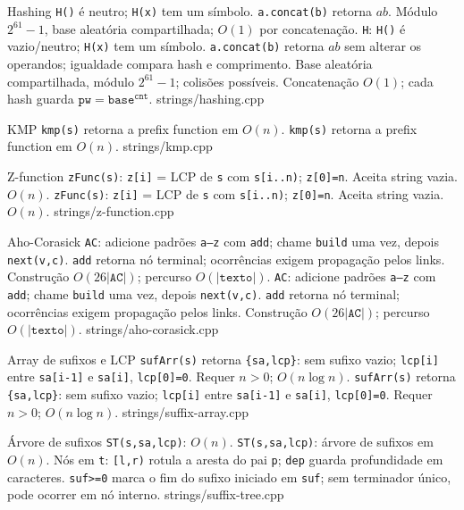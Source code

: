 \templateentry
{Hashing}
{\texttt{H()} é neutro; \texttt{H(x)} tem um símbolo. \texttt{a.concat(b)} retorna $ab$. Módulo $2^{61}-1$, base aleatória compartilhada; $O(1)$ por concatenação.}
{\texttt{H}: \texttt{H()} é vazio/neutro; \texttt{H(x)} tem um símbolo. \texttt{a.concat(b)} retorna $ab$ sem alterar os operandos; igualdade compara hash e comprimento. Base aleatória compartilhada, módulo $2^{61}-1$; colisões possíveis. Concatenação $O(1)$; cada hash guarda $\mathtt{pw}=\mathtt{base}^{\mathtt{cnt}}$.}
{strings/hashing.cpp}

\templateentry
{KMP}
{\texttt{kmp(s)} retorna a prefix function em $O(n)$.}
{\texttt{kmp(s)} retorna a prefix function em $O(n)$.}
{strings/kmp.cpp}

\templateentry
{Z-function}
{\texttt{zFunc(s)}: \texttt{z[i]} = LCP de \texttt{s} com \texttt{s[i..n)}; \texttt{z[0]=n}. Aceita string vazia. $O(n)$.}
{\texttt{zFunc(s)}: \texttt{z[i]} = LCP de \texttt{s} com \texttt{s[i..n)}; \texttt{z[0]=n}. Aceita string vazia. $O(n)$.}
{strings/z-function.cpp}

\templateentry
{Aho-Corasick}
{\texttt{AC}: adicione padrões \texttt{a--z} com \texttt{add}; chame \texttt{build} uma vez, depois \texttt{next(v,c)}. \texttt{add} retorna nó terminal; ocorrências exigem propagação pelos links. Construção $O(26|\mathtt{AC}|)$; percurso $O(|\mathtt{texto}|)$.}
{\texttt{AC}: adicione padrões \texttt{a--z} com \texttt{add}; chame \texttt{build} uma vez, depois \texttt{next(v,c)}. \texttt{add} retorna nó terminal; ocorrências exigem propagação pelos links. Construção $O(26|\mathtt{AC}|)$; percurso $O(|\mathtt{texto}|)$.}
{strings/aho-corasick.cpp}

\templateentry
{Array de sufixos e LCP}
{\texttt{sufArr(s)} retorna \texttt{\{sa,lcp\}}: sem sufixo vazio; \texttt{lcp[i]} entre \texttt{sa[i-1]} e \texttt{sa[i]}, \texttt{lcp[0]=0}. Requer $n>0$; $O(n\log n)$.}
{\texttt{sufArr(s)} retorna \texttt{\{sa,lcp\}}: sem sufixo vazio; \texttt{lcp[i]} entre \texttt{sa[i-1]} e \texttt{sa[i]}, \texttt{lcp[0]=0}. Requer $n>0$; $O(n\log n)$.}
{strings/suffix-array.cpp}

\templateentry
{Árvore de sufixos}
{\texttt{ST(s,sa,lcp)}: $O(n)$.}
{\texttt{ST(s,sa,lcp)}: árvore de sufixos em $O(n)$. Nós em \texttt{t}: \texttt{[l,r)} rotula a aresta do pai \texttt{p}; \texttt{dep} guarda profundidade em caracteres. \texttt{suf>=0} marca o fim do sufixo iniciado em \texttt{suf}; sem terminador único, pode ocorrer em nó interno.}
{strings/suffix-tree.cpp}

